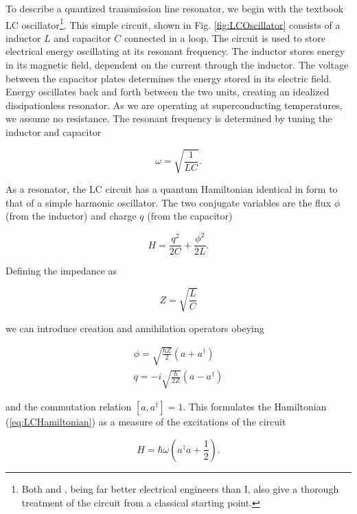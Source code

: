 \documentclass[11 pt, oneside]{book} %
\begin{document}
To describe a quantized transmission line resonator, we begin with the textbook LC oscillator\footnote{Both \cite{Bishop} and \cite{Schuster}, being far better electrical engineers than I, also give a thorough treatment of the circuit from a classical starting point.}. This simple circuit, shown in Fig. \ref{fig:LCOscillator} consists of a inductor $L$ and capacitor $C$ connected in a loop. The circuit is used to store electrical energy oscillating at its resonant frequency. The inductor stores energy in its magnetic field, dependent on the current through the inductor. The voltage between the capacitor plates determines the energy stored in its electric field. Energy oscillates back and forth between the two units, creating an idealized dissipationless resonator. As we are operating at superconducting temperatures, we assume no resistance. The resonant frequency is determined by tuning the inductor and capacitor

\begin{equation}
\omega = \sqrt{\frac{1}{LC}}.
\end{equation}

As a resonator, the LC circuit has a quantum Hamiltonian identical in form to that of a simple harmonic oscillator. The two conjugate variables are the flux $\phi$ (from the inductor) and charge $q$ (from the capacitor)

\begin{equation}\label{eq:LCHamiltonian}
H=\frac{q^2}{2C}+\frac{\phi^2}{2L}.
\end{equation}

Defining the impedance as

\begin{equation}
Z=\sqrt{\frac{L}{C}}
\end{equation}

we can introduce creation and annihilation operators obeying 

\begin{eqnarray}
\phi=\sqrt{\frac{\hbar Z}{2}}\left(a+a^\dag\right) \\
q=-i\sqrt{\frac{\hbar}{2Z}}\left(a-a^\dag\right)
\end{eqnarray}

and the commutation relation $[a,a^\dag]=1$. This formulates the Hamiltonian (\ref{eq:LCHamiltonian}) as a measure of the excitations of the circuit

\begin{equation}\label{eq:SHO}
H=\hbar \omega\left(a^\dag a + \frac{1}{2}\right).
\end{equation}
\end{document}
